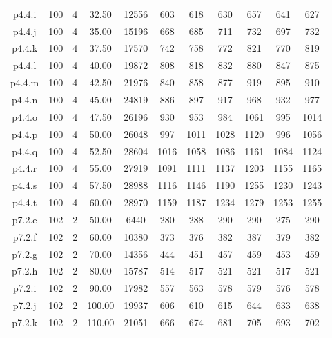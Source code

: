 \begin{center}
\begin{tabular}{ |c|c|c|c|c|c|c|c|c|c|c| }
p4.4.i & 100 & 4 & 32.50 & 12556 & 603 & 618 & 630 & 657 & 641 & 627  \\
p4.4.j & 100 & 4 & 35.00 & 15196 & 668 & 685 & 711 & 732 & 697 & 732  \\
p4.4.k & 100 & 4 & 37.50 & 17570 & 742 & 758 & 772 & 821 & 770 & 819  \\
p4.4.l & 100 & 4 & 40.00 & 19872 & 808 & 818 & 832 & 880 & 847 & 875  \\
p4.4.m & 100 & 4 & 42.50 & 21976 & 840 & 858 & 877 & 919 & 895 & 910  \\
p4.4.n & 100 & 4 & 45.00 & 24819 & 886 & 897 & 917 & 968 & 932 & 977  \\
p4.4.o & 100 & 4 & 47.50 & 26196 & 930 & 953 & 984 & 1061 & 995 & 1014  \\
p4.4.p & 100 & 4 & 50.00 & 26048 & 997 & 1011 & 1028 & 1120 & 996 & 1056  \\
p4.4.q & 100 & 4 & 52.50 & 28604 & 1016 & 1058 & 1086 & 1161 & 1084 & 1124  \\
p4.4.r & 100 & 4 & 55.00 & 27919 & 1091 & 1111 & 1137 & 1203 & 1155 & 1165  \\
p4.4.s & 100 & 4 & 57.50 & 28988 & 1116 & 1146 & 1190 & 1255 & 1230 & 1243  \\
p4.4.t & 100 & 4 & 60.00 & 28970 & 1159 & 1187 & 1234 & 1279 & 1253 & 1255  \\
p7.2.e & 102 & 2 & 50.00 & 6440 & 280 & 288 & 290 & 290 & 275 & 290  \\
p7.2.f & 102 & 2 & 60.00 & 10380 & 373 & 376 & 382 & 387 & 379 & 382  \\
p7.2.g & 102 & 2 & 70.00 & 14356 & 444 & 451 & 457 & 459 & 453 & 459  \\
p7.2.h & 102 & 2 & 80.00 & 15787 & 514 & 517 & 521 & 521 & 517 & 521  \\
p7.2.i & 102 & 2 & 90.00 & 17982 & 557 & 563 & 578 & 579 & 576 & 578  \\
p7.2.j & 102 & 2 & 100.00 & 19937 & 606 & 610 & 615 & 644 & 633 & 638  \\
p7.2.k & 102 & 2 & 110.00 & 21051 & 666 & 674 & 681 & 705 & 693 & 702  \\
\hline
\end{tabular}
\end{center}

